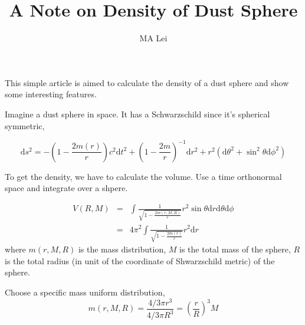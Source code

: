 \documentclass[12pt,a4paper]{article}
\begin{document}
\title{A Note on Density of Dust Sphere}
\author{MA Lei}
\maketitle


\newcommand{\dd}{\mathrm d}
\newenvironment{eqnset}
{\begin{equation}\left \bracevert \begin{array}{l}}
{\end{array} \right. \end{equation}}

\newenvironment{eqn}
{\begin{equation}\left \bracevert \begin{array}{l}}
{\end{array} \right. \end{equation}}




This simple article is aimed to calculate the density of a dust sphere and show some interesting features.

Imagine a dust sphere in space. It has a Schwarzschild since it's spherical symmetric,

\begin{equation}
\mathrm ds^2 = -(1-\frac{2m(r)}{r})c^2 \mathrm dt^2 + (1- \frac{2m}{r})^{-1}\mathrm d r^2 +r^2 (\mathrm d\theta^2 + \sin^2\theta \mathrm d\phi^2)
\end{equation}

To get the density, we have to calculate the volume. Use a time orthonormal space and integrate over a shpere.

\begin{eqnarray}
V(R,M)&=&\int \frac{1}{\sqrt{1-\frac{2m(r,M,R)}{r}}} r^2 \sin\theta \mathrm dr\mathrm d\theta\mathrm d\phi \\
&=&4\pi^2 \int \frac{1}{\sqrt{1-\frac{2m(r)}{r}}}r^2 \mathrm dr
\end{eqnarray}
where $m(r,M,R)$ is the mass distribution,  $M$ is the total mass of the sphere, $R$ is the total radius (in unit of the coordinate of Shwarzschild metric) of the sphere.

Choose a specific mass uniform distribution, 
\begin{equation}
m(r,M,R)=\frac{4/3 \pi r^3}{4/3 \pi R^3}=(\frac{r}{R})^3 M
\end{equation}
\end{document}
